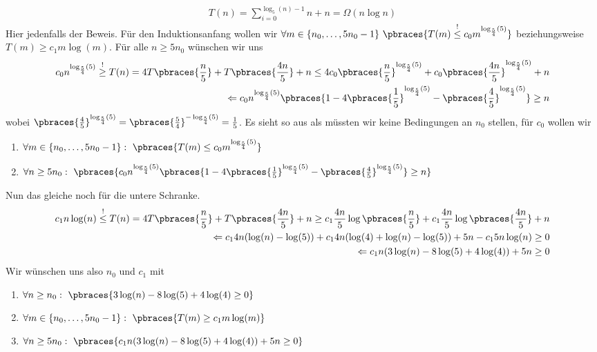 \begin{solution}
  \begin{align*}
    T(n) = \sum_{i=0}^{\log_5(n)-1} n + n = \Omega(n \log n)
  \end{align*}
  Hier jedenfalls der Beweis.
	Für den Induktionsanfang wollen wir $\forall m \in \{n_0, \dots, 5n_0 - 1\} \ \pbraces{T(m) \stackrel{!}{\leq} c_0 m^{\log_\frac{5}{4}(5)}}$ beziehungsweise $T(m) \geq c_1 m \log(m)$.
	Für alle $n \geq 5n_0$ wünschen wir uns
	\begin{align*}
	c_0 n^{\log_\frac{5}{4}(5)} \stackrel{!}{\geq} T(n) = 4 T\pbraces{\frac{n}{5}} + T\pbraces{\frac{4n}{5}} + n \leq 4 c_0 \pbraces{\frac{n}{5}}^{\log_\frac{5}{4}(5)} + c_0 \pbraces{\frac{4n}{5}}^{\log_\frac{5}{4}(5)} + n \\
	\Leftarrow c_0 n^{\log_{\frac{5}{4}}(5)} \pbraces{1 - 4  \pbraces{\frac{1}{5}}^{\log_\frac{5}{4}(5)} - \pbraces{\frac{4}{5}}^{\log_\frac{5}{4}(5)}} \geq n
	\end{align*}
	wobei $\pbraces{\frac{4}{5}}^{\log_\frac{5}{4}(5)} = \pbraces{\frac{5}{4}}^{-\log_\frac{5}{4}(5)} = \frac{1}{5}$.
	Es sieht so aus als müssten wir keine Bedingungen an $n_0$ stellen, für $c_0$ wollen wir
	\begin{enumerate}
		\item $\forall m \in \{n_0, \dots, 5n_0 - 1\} :~ \pbraces{T(m) \leq c_0 m^{\log_\frac{5}{4}(5)}}$
		\item $\forall n \geq 5n_0:~ \pbraces{c_0 n^{\log_{\frac{5}{4}}(5)} \pbraces{1 - 4  \pbraces{\frac{1}{5}}^{\log_\frac{5}{4}(5)} - \pbraces{\frac{4}{5}}^{\log_\frac{5}{4}(5)}} \geq n}$
	\end{enumerate}
	Nun das gleiche noch für die untere Schranke.
	\begin{align*}
	c_1 n\log(n) \stackrel{!}{\leq} T(n) = 4 T\pbraces{\frac{n}{5}} + T\pbraces{ \frac{4n}{5}} + n \geq c_1 \frac{4n}{5} \log\pbraces{\frac{n}{5}} + c_1 \frac{4n}{5} \log\pbraces{\frac{4n}{5}} + n \\
	\Leftarrow c_1 4n (\log(n) - \log(5)) + c_1 4n (\log(4) + \log(n) - \log(5)) + 5n - c_1 5n \log(n) \geq 0 \\
	\Leftarrow c_1 n(3 \log(n) - 8 \log(5) + 4 \log(4)) + 5n \geq 0
	\end{align*}
	Wir wünschen uns also $n_0$ und $c_1$ mit
		\begin{enumerate}
		\item $\forall n \geq n_0 :~\pbraces{3 \log(n) - 8 \log(5) + 4 \log(4) \geq 0}$
		\item $\forall m \in \{n_0, \dots, 5n_0 - 1\} :~ \pbraces{T(m) \geq c_1 m\log(m)}$
		\item $\forall n \geq 5n_0 :~ \pbraces{c_1 n(3 \log(n) - 8 \log(5) + 4 \log(4)) + 5n \geq 0}$
	\end{enumerate}
\end{solution}
